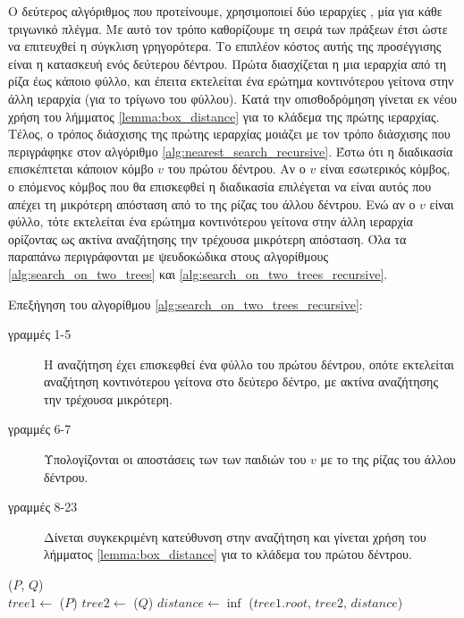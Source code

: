 Ο δεύτερος αλγόριθμος που προτείνουμε, χρησιμοποιεί 
δύο ιεραρχίες , μία για κάθε τριγωνικό 
πλέγμα. 
Με αυτό τον τρόπο καθορίζουμε τη σειρά των πράξεων 
έτσι ώστε να επιτευχθεί η σύγκλιση γρηγορότερα.
Το επιπλέον κόστος αυτής της προσέγγισης είναι 
η κατασκευή ενός δεύτερου δέντρου.
Πρώτα διασχίζεται η μια ιεραρχία από τη ρίζα 
έως κάποιο φύλλο, και έπειτα εκτελείται ένα 
ερώτημα κοντινότερου γείτονα στην άλλη ιεραρχία 
(για το τρίγωνο του φύλλου).
Κατά την οπισθοδρόμηση γίνεται εκ νέου χρήση του 
λήμματος \ref{lemma:box_distance} για το κλάδεμα 
της πρώτης ιεραρχίας.
Τέλος, ο τρόπος διάσχισης της πρώτης ιεραρχίας 
μοιάζει με τον τρόπο διάσχισης που περιγράφηκε 
στον αλγόριθμο \ref{alg:nearest_search_recursive}.
Έστω ότι η διαδικασία επισκέπτεται
κάποιον κόμβο $v$ του πρώτου δέντρου. 
Αν ο $v$ είναι εσωτερικός κόμβος, ο επόμενος κόμβος 
που θα επισκεφθεί η διαδικασία επιλέγεται να είναι 
αυτός που απέχει τη μικρότερη απόσταση από το 
της ρίζας του άλλου δέντρου.
Ενώ αν ο $v$ είναι φύλλο, τότε εκτελείται ένα 
ερώτημα κοντινότερου γείτονα στην άλλη ιεραρχία 
ορίζοντας ως ακτίνα αναζήτησης την τρέχουσα 
μικρότερη απόσταση.
Όλα τα παραπάνω περιγράφονται με ψευδοκώδικα
στους αλγορίθμους \ref{alg:search_on_two_trees} και 
\ref{alg:search_on_two_trees_recursive}.

Επεξήγηση του αλγορίθμου \ref{alg:search_on_two_trees_recursive}:
\begin{description}
    \item[γραμμές 1-5] Η αναζήτηση έχει επισκεφθεί ένα φύλλο 
    του πρώτου δέντρου, οπότε εκτελείται αναζήτηση κοντινότερου 
    γείτονα στο δεύτερο δέντρο, με ακτίνα αναζήτησης την τρέχουσα 
    μικρότερη. 
    \item[γραμμές 6-7] Υπολογίζονται οι αποστάσεις των 
    των παιδιών του $v$ με το  της ρίζας του άλλου δέντρου.
    \item[γραμμές 8-23] Δίνεται συγκεκριμένη κατεύθυνση στην αναζήτηση 
    και γίνεται χρήση του λήμματος \ref{lemma:box_distance} για το 
    κλάδεμα του πρώτου δέντρου.
\end{description}

\IncMargin{1.5em}
\begin{algorithm}[h]
    \caption[Απόσταση Τριγωνικών Πλεγμάτων με Δύο ]{
        }
    \label{alg:search_on_two_trees}
    \DontPrintSemicolon
    \Indm\nonl\meshdist($P$, $Q$)\\
    \Indp
        $tree1 \gets$ \treebuild($P$) \;
        $tree2 \gets$ \treebuild($Q$) \;
        $distance \gets \inf$ \;
        \searchtwotrees($tree1.root$, $tree2$, $distance$) \;

\end{algorithm}
\DecMargin{1.5em}

